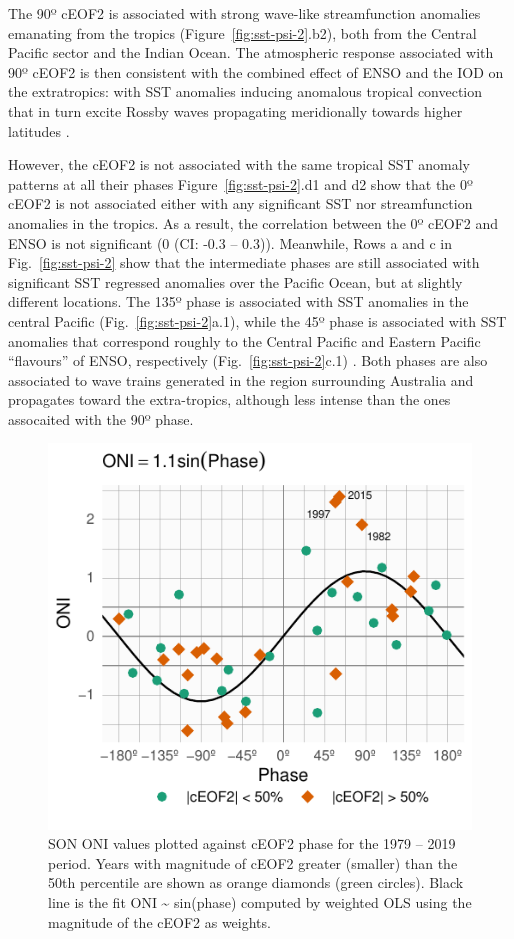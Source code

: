 \documentclass[pdflatex,sn-basic]{sn-jnl}
\theoremstyle{thmstyleone}%
\theoremstyle{thmstyletwo}%
\theoremstyle{thmstylethree}%
\begin{document}
The 90º cEOF2 is associated with strong wave-like streamfunction anomalies emanating from the tropics (Figure~\ref{fig:sst-psi-2}.b2), both from the Central Pacific sector and the Indian Ocean.
The atmospheric response associated with 90º cEOF2 is then consistent with the combined effect of ENSO and the IOD on the extratropics: with SST anomalies inducing anomalous tropical convection that in turn excite Rossby waves propagating meridionally towards higher latitudes \citep{mo2000, cai2011, nuncio2015}.

However, the cEOF2 is not associated with the same tropical SST anomaly patterns at all their phases
Figure~\ref{fig:sst-psi-2}.d1 and d2 show that the 0º cEOF2 is not associated either with any significant SST nor streamfunction anomalies in the tropics.
As a result, the correlation between the 0º cEOF2 and ENSO is not significant (0 (CI: -0.3 -- 0.3)).
Meanwhile, Rows a and c in Fig.~\ref{fig:sst-psi-2} show that the intermediate phases are still associated with significant SST regressed anomalies over the Pacific Ocean, but at slightly different locations.
The 135º phase is associated with SST anomalies in the central Pacific (Fig.~\ref{fig:sst-psi-2}a.1), while the 45º phase is associated with SST anomalies that correspond roughly to the Central Pacific and Eastern Pacific ``flavours'' of ENSO, respectively (Fig.~\ref{fig:sst-psi-2}c.1) \citep{kao2009}.
Both phases are also associated to wave trains generated in the region surrounding Australia and propagates toward the extra-tropics, although less intense than the ones assocaited with the 90º phase.



\begin{figure}
\centering
\includegraphics{../figures/enso-phase-1.pdf}
\caption{\label{fig:enso-phase}SON ONI values plotted against cEOF2 phase for the 1979 -- 2019 period. Years with magnitude of cEOF2 greater (smaller) than the 50th percentile are shown as orange diamonds (green circles). Black line is the fit ONI \textasciitilde{} sin(phase) computed by weighted OLS using the magnitude of the cEOF2 as weights.}
\end{figure}
\end{document}
